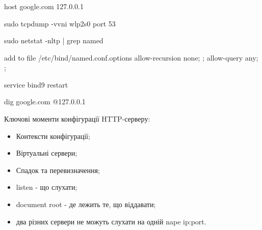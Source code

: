 \documentclass[t]{beamer}  %
\begin{document}
\begin{frame}
	\frametitle{\insertsection} 
	\framesubtitle{\insertsubsection}
host google.com 127.0.0.1

sudo tcpdump -vvni wlp2s0 port 53

sudo netstat -nltp | grep named

add to file /etc/bind/named.conf.options
        allow-recursion { none; };
        allow-query { any; };

service bind9 restart

dig google.com @127.0.0.1

Ключові моменти конфігурації HTTP-серверу:
\begin{itemize}
  \item Контексти конфігурації;
  \item Віртуальні сервери;
  \item Спадок та перевизначення;
  \item listen - що слухати;
  \item document root - де лежить те, що віддавати;
  \item два різних сервери не можуть слухати на одній nape ip:port.
\end{itemize}
\end{frame}
\end{document}
